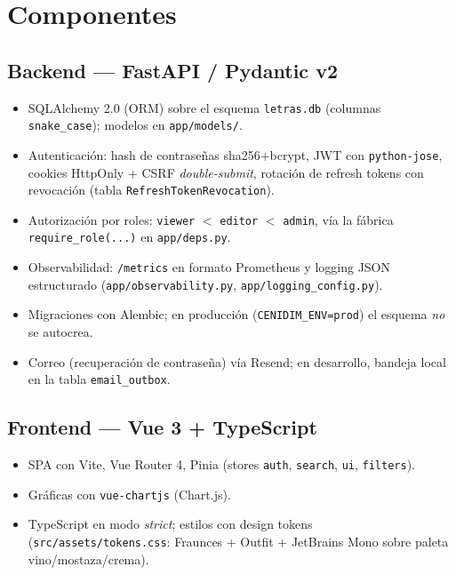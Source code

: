 \documentclass[11pt,letterpaper,twoside]{report}
\newcommand{\codigo}[1]{\texttt{#1}}
\begin{document}
\section{Componentes}

\subsection{Backend --- FastAPI / Pydantic v2}
\begin{itemize}
  \item SQLAlchemy 2.0 (ORM) sobre el esquema \codigo{letras.db}
        (columnas \codigo{snake_case}); modelos en
        \codigo{app/models/}.
  \item Autenticación: hash de contraseñas sha256+bcrypt, JWT con
        \codigo{python-jose}, cookies HttpOnly + CSRF
        \emph{double-submit}, rotación de refresh tokens con revocación
        (tabla \codigo{RefreshTokenRevocation}).
  \item Autorización por roles:
        \codigo{viewer} $<$ \codigo{editor} $<$ \codigo{admin}, vía la
        fábrica \codigo{require_role(...)} en \codigo{app/deps.py}.
  \item Observabilidad: \codigo{/metrics} en formato Prometheus y
        logging JSON estructurado (\codigo{app/\allowbreak observability.py},
        \codigo{app/\allowbreak logging_config.py}).
  \item Migraciones con Alembic; en producción
        (\codigo{CENIDIM\_ENV=\allowbreak prod})
        el esquema \emph{no} se autocrea.
  \item Correo (recuperación de contraseña) vía Resend; en desarrollo,
        bandeja local en la tabla \codigo{email_outbox}.
\end{itemize}

\subsection{Frontend --- Vue 3 + TypeScript}
\begin{itemize}
  \item SPA con Vite, Vue Router 4, Pinia (stores \codigo{auth},
        \codigo{search}, \codigo{ui}, \codigo{filters}).
  \item Gráficas con \codigo{vue-chartjs} (Chart.js).
  \item TypeScript en modo \emph{strict}; estilos con design tokens
        (\codigo{src/assets/tokens.css}: Fraunces + Outfit + JetBrains
        Mono sobre paleta vino/mostaza/crema).
\end{itemize}
\end{document}
